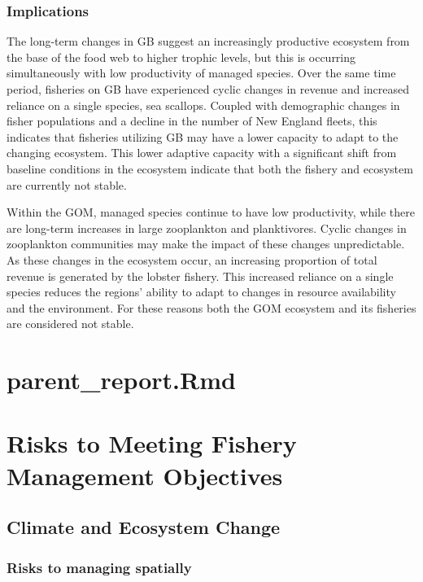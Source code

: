 \documentclass[
  10pt,
]{article}
\begin{document}
\subsubsection{Implications}\label{implications-5}

The long-term changes in GB suggest an increasingly productive ecosystem from the base of the food web to higher trophic levels, but this is occurring simultaneously with low productivity of managed species. Over the same time period, fisheries on GB have experienced cyclic changes in revenue and increased reliance on a single species, sea scallops. Coupled with demographic changes in fisher populations and a decline in the number of New England fleets, this indicates that fisheries utilizing GB may have a lower capacity to adapt to the changing ecosystem. This lower adaptive capacity with a significant shift from baseline conditions in the ecosystem indicate that both the fishery and ecosystem are currently not stable.

Within the GOM, managed species continue to have low productivity, while there are long-term increases in large zooplankton and planktivores. Cyclic changes in zooplankton communities may make the impact of these changes unpredictable. As these changes in the ecosystem occur, an increasing proportion of total revenue is generated by the lobster fishery. This increased reliance on a single species reduces the regions' ability to adapt to changes in resource availability and the environment. For these reasons both the GOM ecosystem and its fisheries are considered not stable.

\section{parent\_report.Rmd}\label{parent_report.rmd-5}

\section{Risks to Meeting Fishery Management Objectives}\label{risks-to-meeting-fishery-management-objectives}

\subsection{Climate and Ecosystem Change}\label{climate-and-ecosystem-change}

\subsubsection{Risks to managing spatially}\label{risks-to-managing-spatially}
\end{document}
